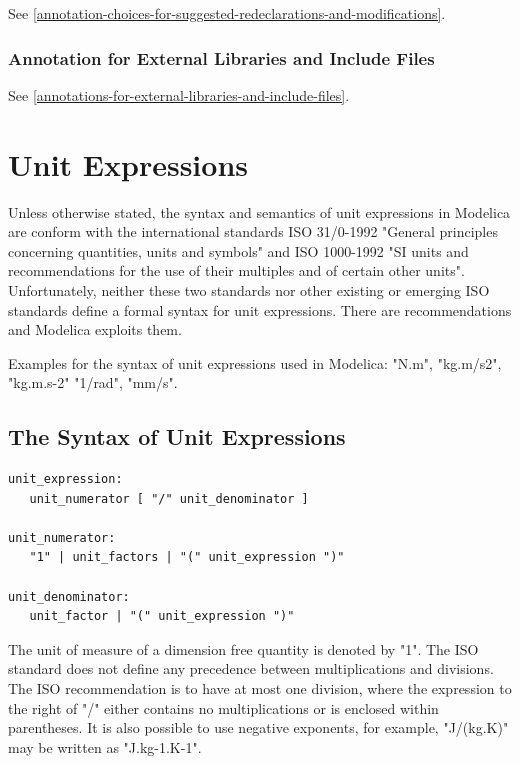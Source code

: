 \documentclass[10pt,a4paper]{report}
\def\doublelabel#1{\label{#1}}
\begin{document}
See \ref{annotation-choices-for-suggested-redeclarations-and-modifications}.

\subsection{Annotation for External Libraries and Include Files}\doublelabel{annotation-for-external-libraries-and-include-files}

See \ref{annotations-for-external-libraries-and-include-files}.

\chapter{Unit Expressions}\doublelabel{unit-expressions}

Unless otherwise stated, the syntax and semantics of unit expressions in
Modelica are conform with the international standards ISO 31/0-1992
"General principles concerning quantities, units and symbols" and ISO
1000-1992 "SI units and recommendations for the use of their multiples
and of certain other units". Unfortunately, neither these two standards
nor other existing or emerging ISO standards define a formal syntax for
unit expressions. There are recommendations and Modelica exploits them.

Examples for the syntax of unit expressions used in Modelica: "N.m",
"kg.m/s2", "kg.m.s-2" "1/rad", "mm/s".

\section{The Syntax of Unit Expressions}\doublelabel{the-syntax-of-unit-expressions}
\begin{lstlisting}[language=grammar]
unit_expression:
   unit_numerator [ "/" unit_denominator ]
   
unit_numerator:
   "1" | unit_factors | "(" unit_expression ")"
   
unit_denominator:
   unit_factor | "(" unit_expression ")"
\end{lstlisting}

The unit of measure of a dimension free quantity is denoted by "1". The
ISO standard does not define any precedence between multiplications and
divisions. The ISO recommendation is to have at most one division, where
the expression to the right of "/" either contains no multiplications or
is enclosed within parentheses. It is also possible to use negative
exponents, for example, "J/(kg.K)" may be written as "J.kg-1.K-1".
\end{document}
